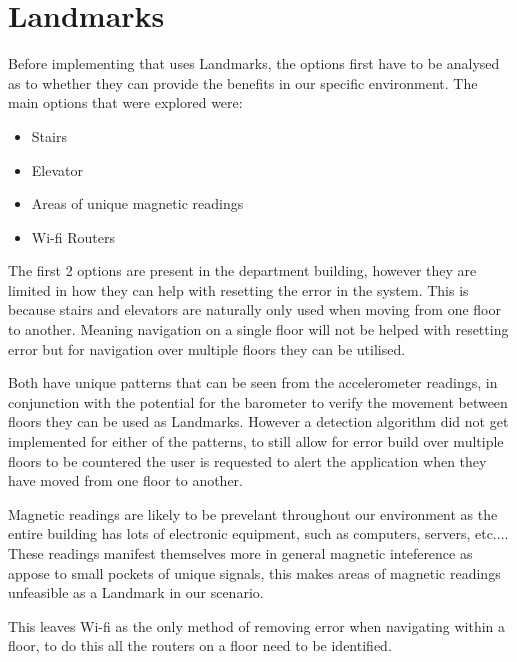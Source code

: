 \documentclass[main.tex]{subfiles}
\begin{document}
\section{Landmarks}

Before implementing that uses Landmarks, the options first have to be analysed as to whether they can provide the benefits in our specific environment. The main options that were explored were:

\begin{itemize}
	\item Stairs
	\item Elevator
	\item Areas of unique magnetic readings
	\item Wi-fi Routers
\end{itemize}

The first 2 options are present in the department building, however they are limited in how they can help with resetting the error in the system. This is because stairs and elevators are naturally only used when moving from one floor to another. Meaning navigation on a single floor will not be helped with resetting error but for navigation over multiple floors they can be utilised. 

Both have unique patterns that can be seen from the accelerometer readings, in conjunction with the potential for the barometer to verify the movement between floors they can be used as Landmarks. However a detection algorithm did not get implemented for either of the patterns, to still allow for error build over multiple floors to be countered the user is requested to alert the application when they have moved from one floor to another.

Magnetic readings are likely to be prevelant throughout our environment as the entire building has lots of electronic equipment, such as computers, servers, etc.... These readings manifest themselves more in general magnetic inteference as appose to small pockets of unique signals, this makes areas of magnetic readings unfeasible as a Landmark in our scenario.

This leaves Wi-fi as the only method of removing error when navigating within a floor, to do this all the routers on a floor need to be identified.
\end{document}
